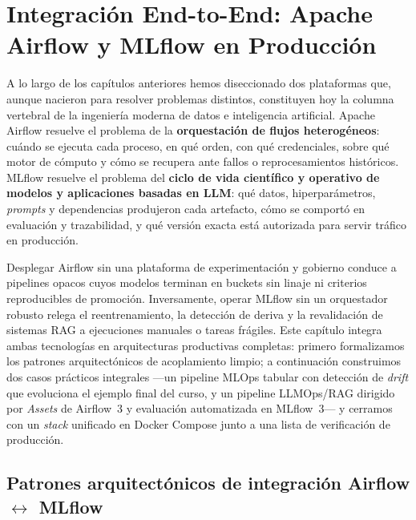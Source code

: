 
\chapter[Integración End-to-End: Airflow y MLflow]{Integración End-to-End: Apache Airflow y MLflow en Producción}\label{chap:integracion}

A lo largo de los capítulos anteriores hemos diseccionado dos plataformas que, aunque nacieron para resolver problemas distintos, constituyen hoy la columna vertebral de la ingeniería moderna de datos e inteligencia artificial. Apache Airflow resuelve el problema de la \textbf{orquestación de flujos heterogéneos}: cuándo se ejecuta cada proceso, en qué orden, con qué credenciales, sobre qué motor de cómputo y cómo se recupera ante fallos o reprocesamientos históricos. MLflow resuelve el problema del \textbf{ciclo de vida científico y operativo de modelos y aplicaciones basadas en LLM}: qué datos, hiperparámetros, \textit{prompts} y dependencias produjeron cada artefacto, cómo se comportó en evaluación y trazabilidad, y qué versión exacta está autorizada para servir tráfico en producción.

Desplegar Airflow sin una plataforma de experimentación y gobierno conduce a pipelines opacos cuyos modelos terminan en buckets sin linaje ni criterios reproducibles de promoción. Inversamente, operar MLflow sin un orquestador robusto relega el reentrenamiento, la detección de deriva y la revalidación de sistemas RAG a ejecuciones manuales o tareas  frágiles. Este capítulo integra ambas tecnologías en arquitecturas productivas completas: primero formalizamos los patrones arquitectónicos de acoplamiento limpio; a continuación construimos dos casos prácticos integrales ---un pipeline MLOps tabular con detección de \textit{drift} que evoluciona el ejemplo final del curso, y un pipeline LLMOps/RAG dirigido por \textit{Assets} de Airflow~3 y evaluación automatizada en MLflow~3--- y cerramos con un \textit{stack} unificado en Docker Compose junto a una lista de verificación de producción.

\section[Patrones de integración Airflow--MLflow]{Patrones arquitectónicos de integración Airflow \texorpdfstring{$\leftrightarrow$}{--} MLflow}\label{sec:patrones-integracion}

